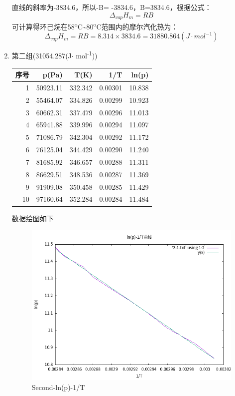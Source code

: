 \documentclass[11pt]{report}
\begin{document}
\begin{enumerate}
直线的斜率为-3834.6，所以-B= -3834.6，B=3834.6，根据公式：
\[
     \Delta_{vap}H_{m}=RB
     \]
可计算得环己烷在58\textsuperscript{o}C\textasciitilde{}80\textsuperscript{o}C范围内的摩尔汽化热为：
\[
     \Delta_{vap}H_{m}=RB=8.314\times 3834.6=31880.864(J\cdot mol^{-1})
     \]
\item 第二组(31054.287(J\(\cdot\) mol\textsuperscript{-1}))
\label{sec:org29f005c}
\begin{center}
\begin{tabular}{rrrrr}
序号 & p(Pa) & T(K) & 1/T & ln(p)\\
\hline
1 & 50923.11 & 332.342 & 0.00301 & 10.838\\
2 & 55464.07 & 334.826 & 0.00299 & 10.923\\
3 & 60662.31 & 337.479 & 0.00296 & 11.013\\
4 & 65941.88 & 339.996 & 0.00294 & 11.097\\
5 & 71086.79 & 342.304 & 0.00292 & 11.172\\
6 & 76125.04 & 344.429 & 0.00290 & 11.240\\
7 & 81685.92 & 346.657 & 0.00288 & 11.311\\
8 & 86629.51 & 348.536 & 0.00287 & 11.369\\
9 & 91909.08 & 350.458 & 0.00285 & 11.429\\
10 & 97160.64 & 352.284 & 0.00284 & 11.484\\
\end{tabular}
\end{center}
数据绘图如下
\begin{figure}[htbp]
\centering
\includegraphics[width=.9\linewidth]{../data/2-1.png}
\caption{Second-ln(p)-1/T}
\end{figure}


\end{enumerate}
\end{document}

